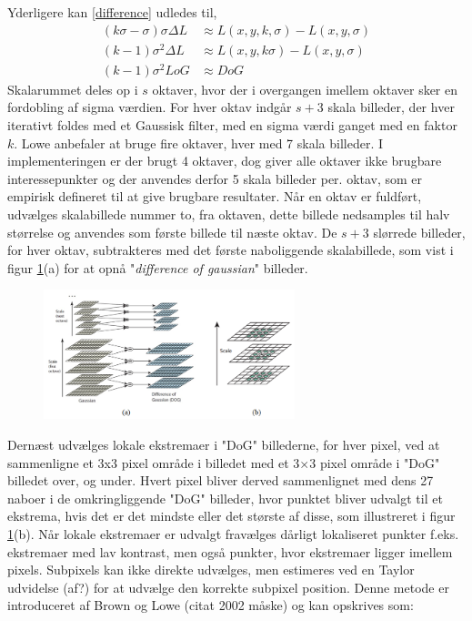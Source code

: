 Yderligere kan \eqref{difference} udledes til,
\begin{equation}
\begin{split}
(k\sigma-\sigma)\sigma\Delta L &\approx L(x,y,k,\sigma)-L(x,y,\sigma) \\
(k-1)\sigma^2\Delta L &\approx L(x,y,k\sigma)-L(x,y,\sigma) \\
(k-1)\sigma^2LoG &\approx DoG
\end{split}
\end{equation}
Skalarummet deles op i $s$ oktaver, hvor der i overgangen imellem oktaver sker en fordobling af sigma værdien. For hver oktav indgår $s+3$ skala billeder, der hver iterativt foldes med et Gaussisk filter, med en sigma værdi ganget med en faktor $k$. Lowe anbefaler at bruge fire oktaver, hver med 7 skala billeder. I implementeringen er der brugt 4 oktaver, dog giver alle oktaver ikke brugbare interessepunkter og der anvendes derfor 5 skala billeder per. oktav, som er empirisk defineret til at give brugbare resultater. Når en oktav er fuldført, udvælges skalabillede nummer to, fra oktaven, dette billede nedsamples til halv størrelse og anvendes som første billede til næste oktav. De $s+3$ slørrede billeder, for hver oktav, subtrakteres med det første naboliggende skalabillede, som vist i figur \ref{fig:difference}(a) for at opnå "\textit{difference of gaussian}" billeder.
\begin{figure}[H]
    \centering
    \includegraphics[width=0.65\textwidth]{fig/30.png}
     \vspace{-1em}
    \begin{center}    
       \caption{\textcolor{gray}{\footnotesize \textit{ }}}
    \label{fig:difference}
     \end{center}
     \vspace{-2.5em}
  \end{figure} \noindent
Dernæst udvælges lokale ekstremaer i "DoG" billederne, for hver pixel, ved at sammenligne et 3x3 pixel område i billedet med et 3$\times$3 pixel område i "DoG" billedet over, og under. Hvert pixel bliver derved sammenlignet med dens 27 naboer i de omkringliggende "DoG" billeder, hvor punktet bliver udvalgt til et ekstrema, hvis det er det mindste eller det største af disse, som illustreret i figur \ref{fig:difference}(b). Når lokale ekstremaer er udvalgt fravælges dårligt lokaliseret punkter f.eks. ekstremaer med lav kontrast, men også punkter, hvor ekstremaer ligger imellem pixels. Subpixels kan ikke direkte udvælges, men estimeres ved en Taylor udvidelse (af?) for at udvælge den korrekte subpixel position. Denne metode er introduceret af Brown og Lowe (citat 2002 måske) og kan opskrives som:
